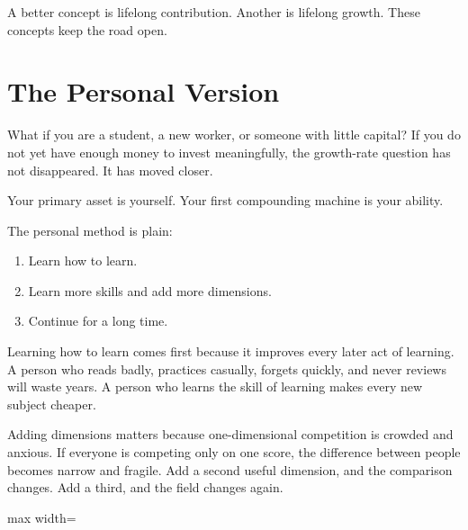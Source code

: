 A better concept is lifelong contribution. Another is lifelong growth. These concepts keep the road open.

\section*{The Personal Version}

What if you are a student, a new worker, or someone with little capital? If you do not yet have enough money to invest meaningfully, the growth-rate question has not disappeared. It has moved closer.

Your primary asset is yourself. Your first compounding machine is your ability.

The personal method is plain:

\begin{enumerate}
\item Learn how to learn.
\item Learn more skills and add more dimensions.
\item Continue for a long time.
\end{enumerate}

Learning how to learn comes first because it improves every later act of learning. A person who reads badly, practices casually, forgets quickly, and never reviews will waste years. A person who learns the skill of learning makes every new subject cheaper.

Adding dimensions matters because one-dimensional competition is crowded and anxious. If everyone is competing only on one score, the difference between people becomes narrow and fragile. Add a second useful dimension, and the comparison changes. Add a third, and the field changes again.

\begin{center}
\begin{adjustbox}{max width=\linewidth}
\end{adjustbox}
\end{center}

